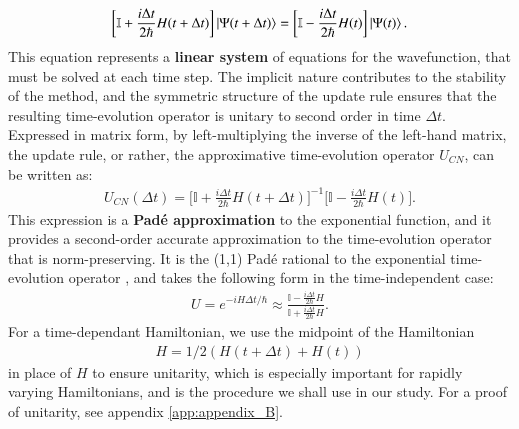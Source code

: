 \documentclass{subfiles}
\begin{document}
\begin{align*}
    \bigg[\mathbb{I} + \frac{i\Delta t}{2\hbar}H(t + \Delta t)\bigg]\ket{\Psi(t + \Delta t)} = \bigg[\mathbb{I} - \frac{i\Delta t}{2\hbar}H(t)\bigg]\ket{\Psi(t)}.
\end{align*}
This equation represents a \textbf{linear system} of equations for the wavefunction, that must be solved at each time step. The implicit nature contributes to the stability of the method, and the symmetric structure of the update rule ensures that the resulting time-evolution operator is unitary to second order in time $\Delta t$. Expressed in matrix form, by left-multiplying the inverse of the left-hand matrix, the update rule, or rather, the approximative time-evolution operator $U_{CN}$, can be written as:
\begin{align*}
    U_{CN} (\Delta t) = \bigg[\mathbb{I} + \frac{i\Delta t}{2\hbar}H(t + \Delta t)\bigg]^{-1}\bigg[\mathbb{I} - \frac{i\Delta t}{2\hbar}H(t)\bigg].
\end{align*}
This expression is a \textbf{Padé approximation} to the exponential function, and it provides a second-order accurate approximation to the time-evolution operator that is norm-preserving. It is the (1,1) Padé rational to the exponential time-evolution operator \cite{moler2003nineteen, higham2008functions}, and takes the following form in the time-independent case:
\begin{align*}
    U = e^{-iH\Delta t/\hbar} \approx \frac{\mathbb{I} - \frac{i\Delta t}{2\hbar}H}{\mathbb{I} + \frac{i\Delta t}{2\hbar}H}.
\end{align*}
For a time-dependant Hamiltonian, we use the midpoint of the Hamiltonian 
\begin{align*}
H = 1/2(H(t+\Delta t) + H(t))
\end{align*} 
in place of $H$ to ensure unitarity, which is especially important for rapidly varying Hamiltonians, and is the procedure we shall use in our study. For a proof of unitarity, see appendix \ref{app:appendix_B}.
\end{document}

